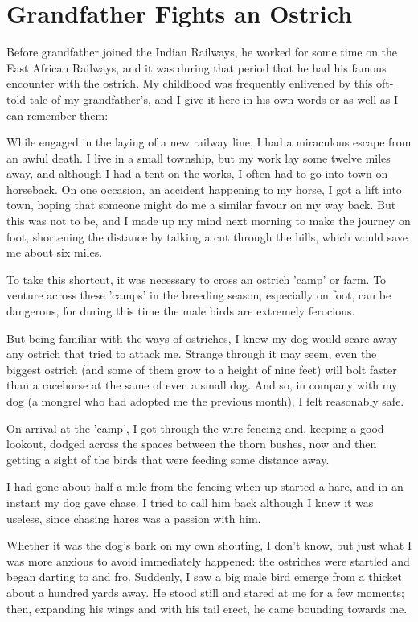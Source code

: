 \chapter{Grandfather Fights an Ostrich}
Before grandfather joined the Indian Railways, he worked for some time on the East African Railways, and it was during that period that he had his famous encounter with the ostrich. My childhood was frequently enlivened by this oft-told tale of my grandfather's, and I give it here in his own words-or as well as I can remember them:
\vspace{0.1in}
\par
While engaged in the laying of a new railway line, I had a miraculous escape from an awful death. I live in a small township, but my work lay some twelve miles away, and although I had a tent on the works, I often had to go into town on horseback.
On one occasion, an accident happening to my horse, I got a lift into town, hoping that someone might do me a similar favour on my way back. But this was not to be, and I made up my mind next morning to make the journey on foot, shortening the distance by talking a cut through the hills, which would save me about six miles.
\par
To take this shortcut, it was necessary to cross an ostrich 'camp' or farm. To venture across these 'camps' in the breeding season, especially on foot, can be dangerous, for during this time the male birds are extremely ferocious.
\par
But being familiar with the ways of ostriches, I knew my dog would scare away any ostrich that tried to attack me. Strange through it may seem, even the biggest ostrich (and some of them grow to a height of nine feet) will bolt faster than a racehorse at the same of even a small dog. And so, in company with my dog (a mongrel who had adopted me the previous month), I felt reasonably safe.
\par
On arrival at the 'camp', I got through the wire fencing and, keeping a good lookout, dodged across the spaces between the thorn bushes, now and then getting a sight of the birds that were feeding some distance away.
\par
I had gone about half a mile from the fencing when up started a hare, and in an instant my dog gave chase. I tried to call him back although I knew it was useless, since chasing hares was a passion with him.
\par
Whether it was the dog's bark on my own shouting, I don't know, but just what I was more anxious to avoid immediately happened: the ostriches were startled and began darting to and fro. Suddenly, I saw a big male bird emerge from a thicket about a hundred yards away. He stood still and stared at me for a few moments; then, expanding his wings and with his tail erect, he came bounding towards me.
